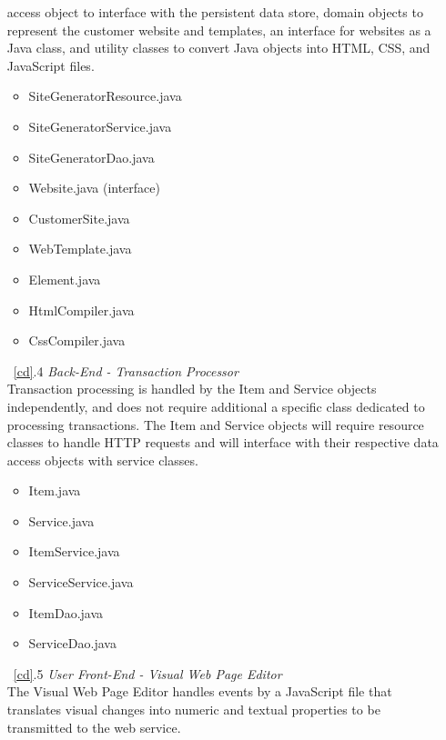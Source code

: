 \documentclass{article}
\newcommand{\br}{\vspace{2mm}}
\begin{document}
\begin{enumerate}
        access object to interface with the persistent data store,
        domain objects to represent the customer website and templates, an interface
        for websites as a Java class, and utility classes to convert Java objects
        into HTML, CSS, and JavaScript files.
        \begin{itemize}
            \item SiteGeneratorResource.java
            \item SiteGeneratorService.java
            \item SiteGeneratorDao.java
            \item Website.java (interface)
            \item CustomerSite.java
            \item WebTemplate.java
            \item Element.java
            \item HtmlCompiler.java
            \item CssCompiler.java
        \end{itemize}
    \item[~\ref{cd}.4 ] \emph{Back-End - Transaction Processor}\br\\
        Transaction processing is handled by the Item and Service objects
        independently, and does not require additional a specific class dedicated
        to processing transactions.  The Item and Service objects will require
        resource classes to handle HTTP requests and will interface with their
        respective data access objects with service classes.
        \begin{itemize}
            \item Item.java
            \item Service.java
            \item ItemService.java
            \item ServiceService.java
            \item ItemDao.java
            \item ServiceDao.java
        \end{itemize}
    \item[~\ref{cd}.5 ] \emph{User Front-End - Visual Web Page Editor}\br\\
        The Visual Web Page Editor handles events by a JavaScript file that
        translates visual changes into numeric and textual properties to be
        transmitted to the web service.
        \begin{itemize}

\end{itemize}
\end{enumerate}
\end{document}
